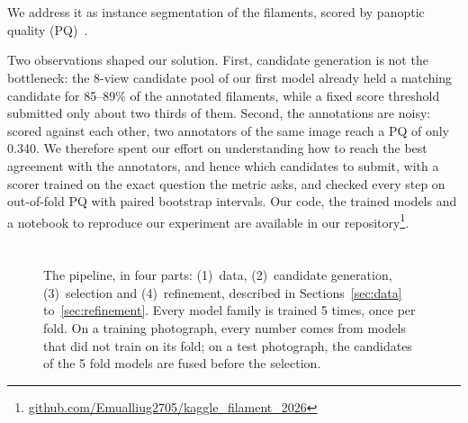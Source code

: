 \documentclass[sigconf]{acmart}
\begin{document}
\section{\texorpdfstring{}{Introduction}}
     We address it as instance segmentation of the filaments, scored by panoptic quality (PQ)~\cite{kirillov2019panoptic}.

    Two observations shaped our solution. First, candidate generation is not the bottleneck: the 8-view candidate pool of our first model already held a matching candidate for 85--89\% of the annotated filaments, while a fixed score threshold submitted only about two thirds of them. Second, the annotations are noisy: scored against each other, two annotators of the same image reach a PQ of only 0.340. We therefore spent our effort on understanding how to reach the best agreement with the annotators, and hence which candidates to submit, with a scorer trained on the exact question the metric asks, and checked every step on out-of-fold PQ with paired bootstrap intervals. Our code, the trained models and a notebook to reproduce our experiment are available in our repository\footnote{\href{https://github.com/Emualliug2705/kaggle_filament_2026}{github.com/Emualliug2705/kaggle\_filament\_2026}}.


\section{\texorpdfstring{}{Methodology}}\label{sec:methodology}

\begin{figure}[t]
\centering

\caption{The pipeline, in four parts: (1)~data, (2)~candidate generation, (3)~selection and (4)~refinement, described in Sections~\ref{sec:data} to~\ref{sec:refinement}. Every model family is trained 5 times, once per fold. On a training photograph, every number comes from models that did not train on its fold; on a test photograph, the candidates of the 5 fold models are fused before the selection.}
\label{fig:pipeline}
\end{figure}
\end{document}
